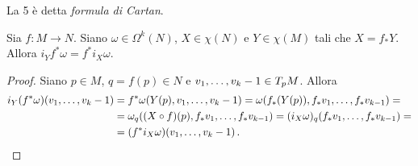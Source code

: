 La 5 è detta \emph{formula di Cartan}.

\begin{proposition}
	Sia $f:M\to N$. Siano $\omega \in \Omega^k(N)$, $X \in \chi(N)$ e $Y \in \chi(M)$ tali che $X = f_*Y$. Allora $i_Yf^*\omega = f^* i_X\omega$.
\end{proposition}
\begin{proof}
	Siano $p\in M$, $q=f(p)\in N$ e $\seqb v{k-1}, \in T_pM$. Allora
	\begin{align*}
		i_Y(f^*\omega)(\seqb v{k-1},) &= f^* \omega (Y(p), \seqb v{k-1},) = \omega (f_*(Y(p)), f_*v_1,\ldots, f_*v_{k-1}) = \\
		&= \omega_q((X\circ f)(p),f_*v_1,\ldots, f_*v_{k-1}) = (i_X\omega)_q (f_*v_1,\ldots, f_*v_{k-1}) =\\
		& =(f^*i_X\omega)(\seqb v{k-1},) \punto 
	\end{align*}
\end{proof}

